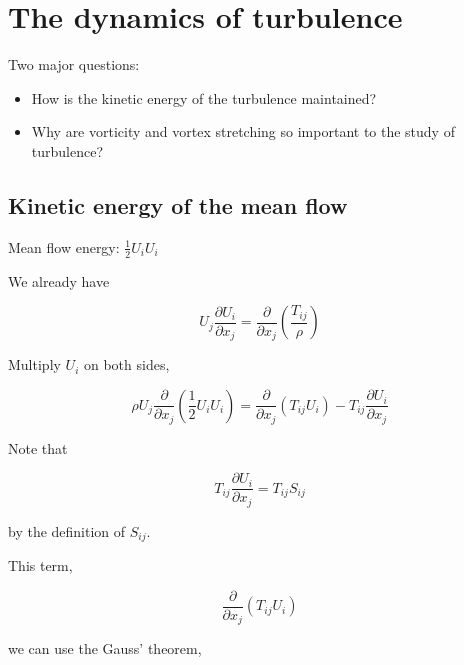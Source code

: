 \documentclass{article}
\begin{document}
\title{}
\author{}
\date{}
\fi


\section{The dynamics of turbulence}

Two major questions:

\begin{itemize}
    \item How is the kinetic energy of the turbulence maintained?
    \item Why are vorticity and vortex stretching so important to the study of turbulence?
\end{itemize}

\subsection{Kinetic energy of the mean flow}

Mean flow energy: $\frac{1}{2}U_iU_i$

We already have

\begin{equation*}
    U_j\frac{\partial U_i}{\partial x_j}=\frac{\partial}{\partial x_j}\left(\frac{T_{ij}}{\rho}\right)
\end{equation*}

Multiply $U_i$ on both sides,

\begin{equation*}
    \rho U_j\frac{\partial}{\partial x_j}\left(\frac{1}{2}U_iU_i\right)=\frac{\partial}{\partial x_j}(T_{ij}U_i)-T_{ij}\frac{\partial U_i}{\partial x_j}
\end{equation*}

Note that

\begin{equation*}
    T_{ij}\frac{\partial U_i}{\partial x_j}=T_{ij}S_{ij}
\end{equation*}

by the definition of $S_{ij}$.

This term,

\begin{equation*}
    \frac{\partial}{\partial x_j}(T_{ij}U_i)
\end{equation*}

we can use the Gauss' theorem,
\end{document}
